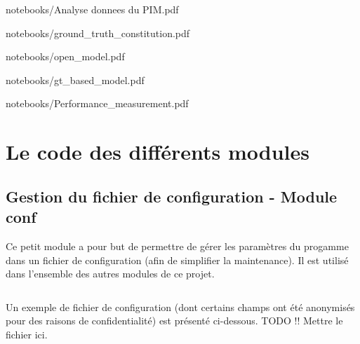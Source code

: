 \documentclass{report}
\begin{document}
        
                    {notebooks/Analyse donnees du PIM.pdf}

        
        {notebooks/ground_truth_constitution.pdf}

        
        {notebooks/open_model.pdf}
 
        
        {notebooks/gt_based_model.pdf}

        
        {notebooks/Performance_measurement.pdf}        
     
    \chapter{Le code des différents modules}

    \section{Gestion du fichier de configuration - Module conf}
    \label{code:conf}
    Ce petit module a pour but de permettre de gérer les paramètres du progamme dans un fichier de configuration (afin de simplifier la maintenance).
    Il est utilisé dans l'ensemble des autres modules de ce projet.

    \begin{multicols}{2}
    \begin{spacing}{1.0}
        \inputminted[fontsize=\tiny]{python}{../src/conf.py}
    \end{spacing}
    \end{multicols}

    Un exemple de fichier de configuration (dont certains champs ont été anonymisés pour des raisons de confidentialité) est présenté ci-dessous.
    TODO !! Mettre le fichier ici.
\end{document}
